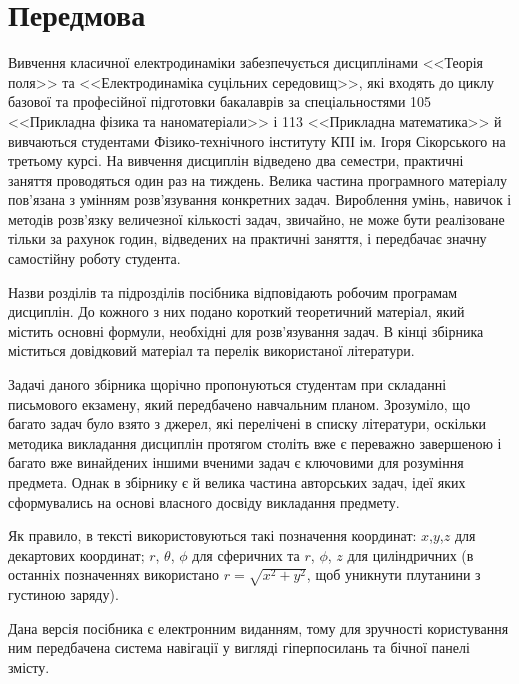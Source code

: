 
\introtrue
\chapter*{Передмова}

Вивчення класичної електродинаміки забезпечується дисциплінами <<Тео\-рія поля>> та <<Електродинаміка суцільних середовищ>>, які входять до циклу базової та професійної підготовки бакалаврів за спеціальностями 105 <<Прикладна фізика та наноматеріали>> і 113 <<Прикладна математика>> й вивчаються студентами Фізико-технічного інституту КПІ ім. Ігоря Сікорського на третьому курсі. На вивчення дисциплін відведено два семестри, практичні заняття проводяться один раз на тиждень. Велика частина програмного матеріалу пов'язана з умінням розв'язування конкретних задач. Вироблення умінь, навичок і методів розв'язку величезної кількості задач, звичайно, не може бути реалізоване тільки за рахунок годин, відведених на практичні заняття, і передбачає значну самостійну роботу студента.

Назви розділів та підрозділів посібника відповідають робочим програмам дисциплін. До кожного з них подано короткий теоретичний матеріал, який містить основні формули, необхідні для розв'язування задач. В кінці збірника міститься довідковий матеріал та перелік використаної літератури. 


Задачі даного збірника щорічно пропонуються студентам при складанні письмового екзамену, який передбачено навчальним планом. Зрозуміло, що багато задач було взято з джерел, які перелічені в списку літератури, оскільки методика викладання дисциплін протягом  століть вже є переважно завершеною і багато вже винайдених іншими вченими задач є ключовими для розуміння предмета. Однак в збірнику є й велика частина авторських задач, ідеї яких сформувались на основі власного досвіду викладання предмету.

Як правило, в тексті використовуються такі позначення координат: $x$,$y$,$z$ для декартових координат;  $r$, $\theta$, $\phi$ для сферичних та  $r$, $\phi$, $z$ для циліндричних (в останніх позначеннях використано $r=\sqrt{x^2+y^2}$,  щоб уникнути плутанини з густиною заряду).
 
Дана версія посібника є електронним виданням, тому для зручності користування ним передбачена система навігації у вигляді гіперпосилань та бічної панелі змісту.

%
\introfalse





